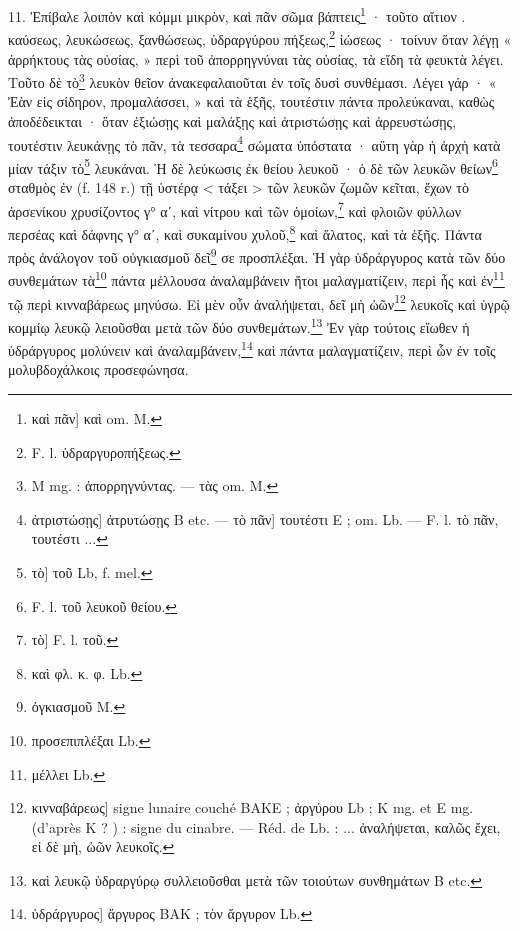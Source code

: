 \documentclass[a4paper, 11pt, oneside, polutonikogreek, french]{article}
\begin{document}
11. Ἐπίβαλε λοιπὸν καὶ κόμμι μικρὸν, καὶ πᾶν σῶμα βάπτεις\footnote{καὶ πᾶν] καὶ om. M.} · τοῦτο αἴτιον . καύσεως, λευκώσεως, ξανθώσεως, ὑδραργύρου πήξεως,\footnote{F. l. ὑδραργυροπήξεως.} ἰώσεως · τοίνυν ὅταν λέγῃ « ἀρρήκτους τὰς οὐσίας, » περὶ τοῦ ἀπορρηγνύναι τὰς οὐσίας, τὰ εἴδη τὰ φευκτὰ λέγει. Τοῦτο δὲ τὸ\footnote{M mg. : ἀπορρηγνύντας. --- τὰς om. M.} λευκὸν θεῖον ἀνακεφαλαιοῦται ἐν τοῖς δυσὶ συνθέμασι. Λέγει γάρ · « Ἐὰν εἰς σίδηρον, προμαλάσσει, » καὶ τὰ ἑξῆς, τουτέστιν πάντα προλεύκαναι, καθὼς ἀποδέδεικται · ὅταν ἐξιώσῃς καὶ μαλάξῃς καὶ ἀτριστώσῃς καὶ ἀρρευστώσῃς, τουτέστιν λευκάνῃς τὸ πᾶν, τὰ τεσσαρα\footnote{ἀτριστώσῃς] ἀτρυτώσῃς B etc. --- τὸ πᾶν] τουτέστι E ; om. Lb. --- F. l. τὸ πᾶν, τουτέστι ...} σώματα ὑπόστατα · αὕτη γὰρ ἡ ἀρχὴ κατὰ μίαν τάξιν τὸ\footnote{τὸ] τοῦ Lb, f. mel.} λευκάναι. Ἡ δὲ λεύκωσις ἐκ θείου λευκοῦ · ὁ δὲ τῶν λευκῶν θείων\footnote{F. l. τοῦ λευκοῦ θείου.} σταθμὸς ἐν (f. 148 r.) τῇ ὑστέρᾳ < τάξει > τῶν λευκῶν ζωμῶν κεῖται, ἔχων τὸ ἀρσενίκου χρυσίζοντος γ° αʹ, καὶ νίτρου καὶ τῶν ὁμοίων,\footnote{τὸ] F. l. τοῦ.} καὶ φλοιῶν φύλλων περσέας καὶ δάφνης γ° αʹ, καὶ συκαμίνου χυλοῦ,\footnote{καὶ φλ. κ. φ. Lb.} καὶ ἅλατος, καὶ τὰ ἑξῆς. Πάντα πρὸς ἀνάλογον τοῦ οὐγκιασμοῦ δεῖ\footnote{ὀγκιασμοῦ M.} σε προσπλέξαι. Ἡ γὰρ ὑδράργυρος κατὰ τῶν δύο συνθεμάτων τὰ\footnote{προσεπιπλέξαι Lb.} πάντα μέλλουσα ἀναλαμβάνειν ἤτοι μαλαγματίζειν, περὶ ἧς καὶ ἐν\footnote{μέλλει Lb.} τῷ περὶ κινναβάρεως μηνύσω. Εἰ μὲν οὖν ἀναλήψεται, δεῖ μὴ ὠῶν\footnote{κινναβάρεως] signe lunaire couché BAKE ; ἀργύρου Lb ; K mg. et E mg. (d'après K ? ) : signe du cinabre. --- Réd. de Lb. : ... ἀναλήψεται, καλῶς ἔχει, εἰ δὲ μὴ, ὠῶν λευκοῖς.} λευκοῖς καὶ ὑγρῷ κομμίῳ λευκῷ λειοῦσθαι μετὰ τῶν δύο συνθεμάτων.\footnote{καὶ λευκῷ ὑδραργύρῳ συλλειοῦσθαι μετὰ τῶν τοιούτων συνθημάτων B etc.} Ἐν γὰρ τούτοις εἴωθεν ἡ ὑδράργυρος μολύνειν καὶ ἀναλαμβάνειν,\footnote{ὑδράργυρος] ἄργυρος BAK ; τὸν ἄργυρον Lb.} καὶ πάντα μαλαγματίζειν, περὶ ὧν ἐν τοῖς μολυβδοχάλκοις προσεφώνησα.
\end{document}
